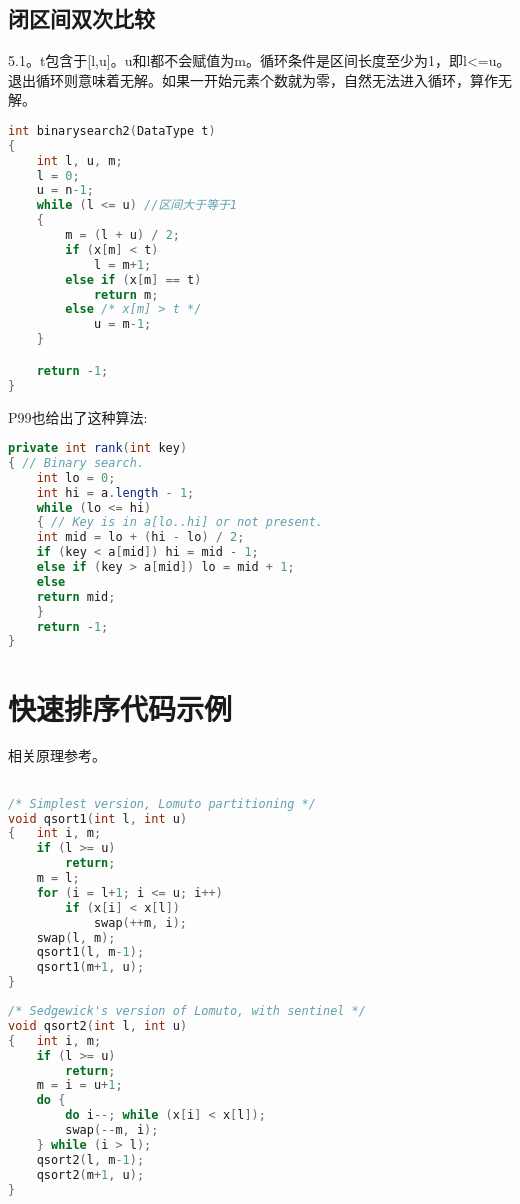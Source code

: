 \subsection{闭区间双次比较}
\cite{pp}5.1。t包含于[l,u]。u和l都不会赋值为m。循环条件是区间长度至少为1，即l<=u。退出循环则意味着无解。如果一开始元素个数就为零，自然无法进入循环，算作无解。
\begin{lstlisting}[language=C]
int binarysearch2(DataType t)
{	
	int l, u, m;
	l = 0;
	u = n-1;
	while (l <= u) //区间大于等于1 
	{
		m = (l + u) / 2;
		if (x[m] < t)
			l = m+1;
		else if (x[m] == t)
			return m;
		else /* x[m] > t */
			u = m-1;
	}

	return -1;
}


\end{lstlisting}

\cite{sedgewick}P99也给出了这种算法:

\begin{lstlisting}[language=Java]
private int rank(int key)
{ // Binary search.
    int lo = 0;
    int hi = a.length - 1;
    while (lo <= hi)
    { // Key is in a[lo..hi] or not present.
	int mid = lo + (hi - lo) / 2;
	if (key < a[mid]) hi = mid - 1;
	else if (key > a[mid]) lo = mid + 1;
	else
	return mid;
    }
    return -1;
}

\end{lstlisting}










\section{快速排序代码示例}

\label{codes:quicksort}


相关原理参考\label{summary:quicksort}。

\begin{lstlisting}[language=C]

/* Simplest version, Lomuto partitioning */
void qsort1(int l, int u)
{	int i, m;
	if (l >= u)
		return;
	m = l;
	for (i = l+1; i <= u; i++)
		if (x[i] < x[l])
			swap(++m, i);
	swap(l, m);
	qsort1(l, m-1);
	qsort1(m+1, u);
}
\end{lstlisting}

\begin{lstlisting}[language=C]
/* Sedgewick's version of Lomuto, with sentinel */
void qsort2(int l, int u)
{	int i, m;
	if (l >= u)
		return;
	m = i = u+1;
	do {
		do i--; while (x[i] < x[l]);
		swap(--m, i);
	} while (i > l);
	qsort2(l, m-1);
	qsort2(m+1, u);
}
\end{lstlisting}


